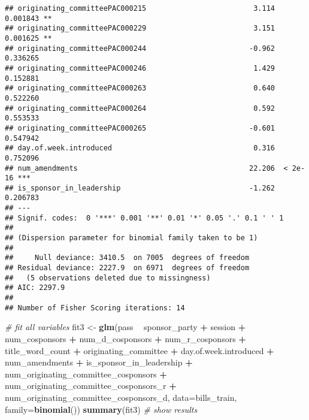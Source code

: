 \documentclass[]{article}
\newenvironment{Shaded}{\begin{snugshade}}{\end{snugshade}}
\newcommand{\KeywordTok}[1]{\textcolor[rgb]{0.13,0.29,0.53}{\textbf{#1}}}
\newcommand{\DataTypeTok}[1]{\textcolor[rgb]{0.13,0.29,0.53}{#1}}
\newcommand{\StringTok}[1]{\textcolor[rgb]{0.31,0.60,0.02}{#1}}
\newcommand{\CommentTok}[1]{\textcolor[rgb]{0.56,0.35,0.01}{\textit{#1}}}
\newcommand{\OperatorTok}[1]{\textcolor[rgb]{0.81,0.36,0.00}{\textbf{#1}}}
\newcommand{\NormalTok}[1]{#1}
\begin{document}
\begin{verbatim}
## originating_committeePAC000215                         3.114 0.001843 ** 
## originating_committeePAC000229                         3.151 0.001625 ** 
## originating_committeePAC000244                        -0.962 0.336265    
## originating_committeePAC000246                         1.429 0.152881    
## originating_committeePAC000263                         0.640 0.522260    
## originating_committeePAC000264                         0.592 0.553533    
## originating_committeePAC000265                        -0.601 0.547942    
## day.of.week.introduced                                 0.316 0.752096    
## num_amendments                                        22.206  < 2e-16 ***
## is_sponsor_in_leadership                              -1.262 0.206783    
## ---
## Signif. codes:  0 '***' 0.001 '**' 0.01 '*' 0.05 '.' 0.1 ' ' 1
## 
## (Dispersion parameter for binomial family taken to be 1)
## 
##     Null deviance: 3410.5  on 7005  degrees of freedom
## Residual deviance: 2227.9  on 6971  degrees of freedom
##   (5 observations deleted due to missingness)
## AIC: 2297.9
## 
## Number of Fisher Scoring iterations: 14
\end{verbatim}

\begin{Shaded}
\begin{Highlighting}[]
\CommentTok{# fit all variables}
\NormalTok{fit3 <-}\StringTok{ }\KeywordTok{glm}\NormalTok{(pass }\OperatorTok{~}\StringTok{ }\NormalTok{sponsor_party }\OperatorTok{+}\StringTok{ }\NormalTok{session }\OperatorTok{+}\StringTok{ }\NormalTok{num_cosponsors }\OperatorTok{+}\StringTok{ }\NormalTok{num_d_cosponsors }\OperatorTok{+}\StringTok{ }\NormalTok{num_r_cosponsors }\OperatorTok{+}\StringTok{ }\NormalTok{title_word_count }\OperatorTok{+}\StringTok{ }\NormalTok{originating_committee }\OperatorTok{+}\StringTok{ }\NormalTok{day.of.week.introduced }\OperatorTok{+}\StringTok{ }\NormalTok{num_amendments }\OperatorTok{+}\StringTok{ }\NormalTok{is_sponsor_in_leadership }\OperatorTok{+}\StringTok{ }\NormalTok{num_originating_committee_cosponsors }\OperatorTok{+}\StringTok{ }\NormalTok{num_originating_committee_cosponsors_r }\OperatorTok{+}\StringTok{ }\NormalTok{num_originating_committee_cosponsors_d, }\DataTypeTok{data=}\NormalTok{bills_train, }\DataTypeTok{family=}\KeywordTok{binomial}\NormalTok{())}
\KeywordTok{summary}\NormalTok{(fit3) }\CommentTok{# show results}
\end{Highlighting}
\end{Shaded}
\end{document}
